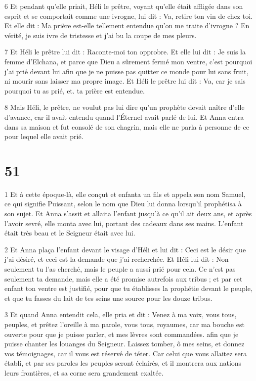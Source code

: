 \par 6 Et pendant qu'elle priait, Héli le prêtre, voyant qu'elle était affligée dans son esprit et se comportait comme une ivrogne, lui dit : Va, retire ton vin de chez toi. Et elle dit : Ma prière est-elle tellement entendue qu'on me traite d'ivrogne ? En vérité, je suis ivre de tristesse et j'ai bu la coupe de mes pleurs.

\par 7 Et Héli le prêtre lui dit : Raconte-moi ton opprobre. Et elle lui dit : Je suis la femme d'Elchana, et parce que Dieu a sûrement fermé mon ventre, c'est pourquoi j'ai prié devant lui afin que je ne puisse pas quitter ce monde pour lui sans fruit, ni mourir sans laisser ma propre image. Et Héli le prêtre lui dit : Va, car je sais pourquoi tu as prié, et. ta prière est entendue.

\par 8 Mais Héli, le prêtre, ne voulut pas lui dire qu'un prophète devait naître d'elle d'avance, car il avait entendu quand l'Éternel avait parlé de lui. Et Anna entra dans sa maison et fut consolé de son chagrin, mais elle ne parla à personne de ce pour lequel elle avait prié.

\chapter{51}

\par 1 Et à cette époque-là, elle conçut et enfanta un fils et appela son nom Samuel, ce qui signifie Puissant, selon le nom que Dieu lui donna lorsqu'il prophétisa à son sujet. Et Anna s'assit et allaita l'enfant jusqu'à ce qu'il ait deux ans, et après l'avoir sevré, elle monta avec lui, portant des cadeaux dans ses mains. L'enfant était très beau et le Seigneur était avec lui.

\par 2 Et Anna plaça l'enfant devant le visage d'Héli et lui dit : Ceci est le désir que j'ai désiré, et ceci est la demande que j'ai recherchée. Et Héli lui dit : Non seulement tu l'as cherché, mais le peuple a aussi prié pour cela. Ce n'est pas seulement ta demande, mais elle a été promise autrefois aux tribus ; et par cet enfant ton ventre est justifié, pour que tu établisses la prophétie devant le peuple, et que tu fasses du lait de tes seins une source pour les douze tribus.

\par 3 Et quand Anna entendit cela, elle pria et dit : Venez à ma voix, vous tous, peuples, et prêtez l'oreille à ma parole, vous tous, royaumes, car ma bouche est ouverte pour que je puisse parler, et mes lèvres sont commandées. afin que je puisse chanter les louanges du Seigneur. Laissez tomber, ô mes seins, et donnez vos témoignages, car il vous est réservé de téter. Car celui que vous allaitez sera établi, et par ses paroles les peuples seront éclairés, et il montrera aux nations leurs frontières, et sa corne sera grandement exaltée.

